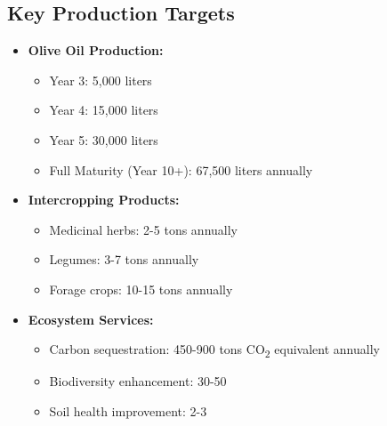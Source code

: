 \subsection{Key Production Targets}
\begin{itemize}
    \item \textbf{Olive Oil Production:}
    \begin{itemize}
        \item Year 3: 5,000 liters
        \item Year 4: 15,000 liters
        \item Year 5: 30,000 liters
        \item Full Maturity (Year 10+): 67,500 liters annually
    \end{itemize}
    
    \item \textbf{Intercropping Products:}
    \begin{itemize}
        \item Medicinal herbs: 2-5 tons annually
        \item Legumes: 3-7 tons annually
        \item Forage crops: 10-15 tons annually
    \end{itemize}
    
    \item \textbf{Ecosystem Services:}
    \begin{itemize}
        \item Carbon sequestration: 450-900 tons CO\textsubscript{2} equivalent annually
        \item Biodiversity enhancement: 30-50%
        \item Soil health improvement: 2-3%
    \end{itemize}
\end{itemize}

